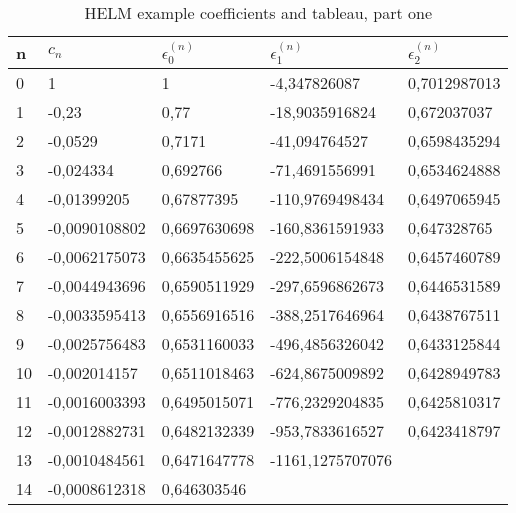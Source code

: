 \begin{table}[h]
	\tiny
	\begin{tabular}{|l|l|l|l|l|}
		n	& $c_n$			& $\epsilon_0^{(n)}$	& $\epsilon_1^{(n)}$	& $\epsilon_2^{(n)}$ \\ \hline
		0	& 1				& 1						& -4,347826087			& 0,7012987013 \\
		1	& -0,23			& 0,77					& -18,9035916824		& 0,672037037 \\
		2	& -0,0529		& 0,7171				& -41,094764527			& 0,6598435294 \\
		3	& -0,024334		& 0,692766				& -71,4691556991		& 0,6534624888 \\
		4	& -0,01399205	& 0,67877395			& -110,9769498434		& 0,6497065945 \\
		5	& -0,0090108802	& 0,6697630698			& -160,8361591933		& 0,647328765 \\
		6	& -0,0062175073	& 0,6635455625			& -222,5006154848		& 0,6457460789 \\
		7	& -0,0044943696	& 0,6590511929			& -297,6596862673		& 0,6446531589 \\
		8	& -0,0033595413	& 0,6556916516			& -388,2517646964		& 0,6438767511 \\
		9	& -0,0025756483	& 0,6531160033			& -496,4856326042		& 0,6433125844 \\
		10	& -0,002014157	& 0,6511018463			& -624,8675009892		& 0,6428949783 \\
		11	& -0,0016003393	& 0,6495015071			& -776,2329204835		& 0,6425810317 \\
		12	& -0,0012882731	& 0,6482132339			& -953,7833616527		& 0,6423418797 \\
		13	& -0,0010484561	& 0,6471647778			& -1161,1275707076 \\
		14	& -0,0008612318	& 0,646303546
	\end{tabular}
	\caption{HELM example coefficients and tableau, part one}
	\label{tab:helm_example_data_one}
\end{table}

